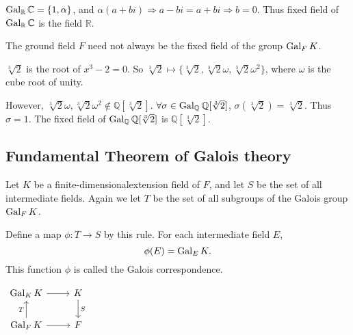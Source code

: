 \begin{example}
    $\operatorname{Gal}_{\mathbb{R}} \mathbb{C} = \{ 1, \alpha \}$, and $\alpha(a + bi) \Longrightarrow a - bi = a+ bi \Longrightarrow b =0$. 
    Thus fixed field of $\operatorname{Gal}_{\mathbb{R}} \mathbb{C}$ is the field $\mathbb{R}$.
\end{example}

\begin{remark}
    The ground field $F$ need not always be the fixed field of the group $\operatorname{Gal}_F K$.
\end{remark}

\begin{example}
    $\sqrt[3]{2}$ is the root of $x^3 - 2 = 0$. So $\sqrt[3]{2} \mapsto \{ \sqrt[3]{2}, \sqrt[3]{2} \omega, \sqrt[3]{2} \omega^2 \}$, 
    where $\omega$ is the cube root of unity.

    However, $\sqrt[3]{2} \omega, \sqrt[3]{2} \omega^2 \notin \mathbb{Q}[\sqrt[3]{2}]$. $\forall \sigma \in \operatorname{Gal}_\mathbb{Q} \mathbb{Q}[\sqrt[3]{2}]$,
    $\sigma(\sqrt[3]{2}) = \sqrt[3]{2}$. Thus $\sigma = 1$. The fixed field of $\operatorname{Gal}_\mathbb{Q} \mathbb{Q}[\sqrt[3]{2}]$ is 
    $\mathbb{Q}[\sqrt[3]{2}]$.
\end{example}

\subsection{Fundamental Theorem of Galois theory}

\begin{definition}
    Let $K$ be a finite-dimensionalextension field of $F$, and let 
    $S$ be the set of all intermediate fields. Again we let 
    $T$ be the set of all subgroups of the Galois group $\operatorname{Gal}_F K$.

    Define a map $\phi : T \to S$ by this rule. For each intermediate field $E$,
    \begin{equation}
        \phi(E) = \operatorname{Gal}_E K.
    \end{equation} 
    This function $\phi$ is called the Galois correspondence.

    \begin{center}
        $\begin{tikzcd}
            \gal_K K \arrow[r] 
            & K \arrow[d, "S"] \\
            \gal_F K \arrow[u,"T"] \arrow[r]
            & F
            \end{tikzcd}
        $
    \end{center}
\end{definition}

